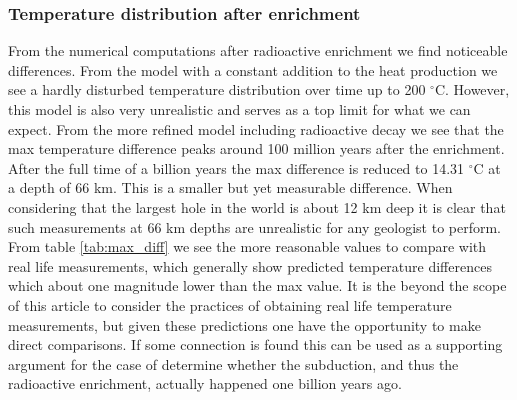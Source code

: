 \documentclass[%
 reprint,
nofootinbib,
aps,
]{revtex4-1}
\begin{document}
\subsubsection{Temperature distribution after enrichment}
From the numerical computations after radioactive enrichment we find noticeable differences. From the model with a constant addition to the heat production we see a hardly disturbed temperature distribution over time up to 200 $^{\circ}$C. However, this model is also very unrealistic and serves as a top limit for what we can expect. From the more refined model including radioactive decay we see that the max temperature difference peaks around 100 million years after the enrichment. After the full time of a billion years the max difference is reduced to 14.31 $^{\circ}$C at a depth of 66 km. This is a smaller but yet measurable difference. When considering that the largest hole in the world is about 12 km deep it is clear that such measurements at 66 km depths are unrealistic for any geologist to perform. From table \ref{tab:max_diff} we see the more reasonable values to compare with real life measurements, which generally show predicted temperature differences which about one magnitude lower than the max value. It is the beyond the scope of this article to consider the practices of obtaining real life temperature measurements, but given these predictions one have the opportunity to make direct comparisons. If some connection is found this can be used as a supporting argument for the case of determine whether the subduction, and thus the radioactive enrichment, actually happened one billion years ago.
\end{document}

